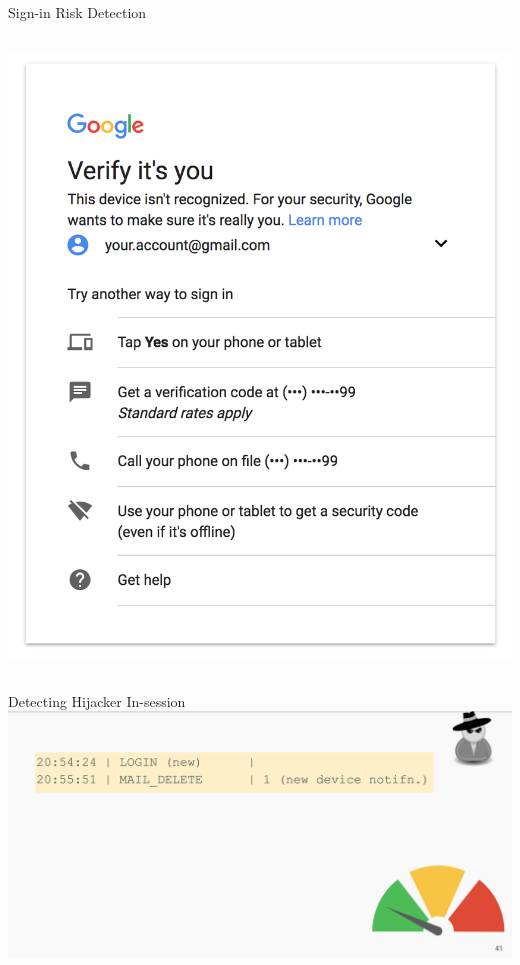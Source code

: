 \documentclass[nobackground,dvipsnames,table]{beamer}
\begin{document}
\begin{frame}{Sign-in Risk Detection}
\begin{columns}
            \includegraphics[width=\textwidth]{google-2fa}
    \end{columns}
\end{frame}

\begin{frame}{Detecting Hijacker In-session}
    \includegraphics[width=\textwidth]{detecting-hijackers-1}
\end{frame}
\end{document}
